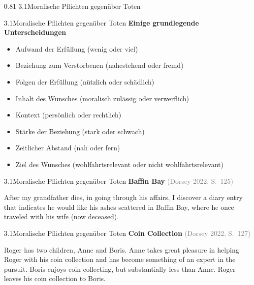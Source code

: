 \documentclass[xcolor=table,9pt,aspectratio=169]{beamer}
\begin{document}
\begin{frame}
\begin{overlayarea}{\textwidth}{0.81\paperheight}{
   \vspace*{11mm}
   \textcolor{uolblue}
   {3.1\hspace*{1em}Moralische Pflichten gegenüber Toten}
}
\end{overlayarea}
\end{frame}


\begin{frame}{\vspace*{10mm}3.1\hspace*{1em}Moralische Pflichten gegenüber Toten}
\textbf{Einige grundlegende Unterscheidungen}
\begin{itemize}
   \item Aufwand der Erfüllung (wenig oder viel)
   \item Beziehung zum Verstorbenen (nahestehend oder fremd)
   \item Folgen der Erfüllung (nützlich oder schädlich)
   \item Inhalt des Wunsches (moralisch zulässig oder verwerflich)
   \item Kontext (persönlich oder rechtlich)
   \item Stärke der Beziehung (stark oder schwach)
   \item Zeitlicher Abstand (nah oder fern)
   \item Ziel des Wunsches (wohlfahrtsrelevant oder nicht wohlfahrtsrelevant)
\end{itemize}
\end{frame}


\begin{frame}{\vspace*{10mm}3.1\hspace*{1em}Moralische Pflichten gegenüber Toten}
\textbf{Baffin Bay} \textcolor{gray}{(Dorsey 2022, S.~125)}

\smallskip
After my grandfather dies, in going through his affairs, I discover a diary entry that indicates he would like his ashes scattered in Baffin Bay, where he once traveled with his wife (now deceased).
\end{frame}


\begin{frame}{\vspace*{10mm}3.1\hspace*{1em}Moralische Pflichten gegenüber Toten}
\textbf{Coin Collection} \textcolor{gray}{(Dorsey 2022, S.~127)}

\smallskip
Roger has two children, Anne and Boris.
Anne takes great pleasure in helping Roger with his coin collection and has become something of an expert in the pursuit.
Boris enjoys coin collecting, but substantially less than Anne.
Roger leaves his coin collection to Boris.
\end{frame}
\end{document}
